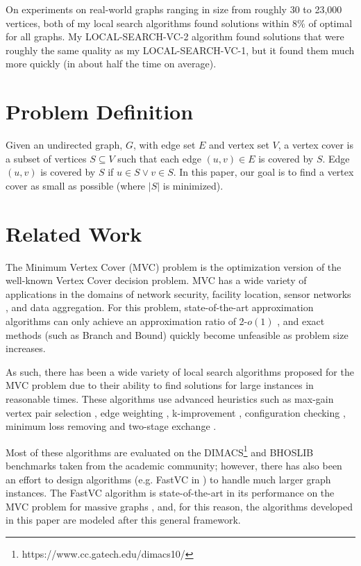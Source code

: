 \documentclass[sigconf]{acmart}
\begin{document}
On experiments on real-world graphs ranging in size from roughly 30 to 23,000 vertices, both of my local search algorithms found solutions within 8\% of optimal for all graphs. My LOCAL-SEARCH-VC-2 algorithm found solutions that were roughly the same quality as my LOCAL-SEARCH-VC-1, but it found them much more quickly (in about half the time on average).


\section{Problem Definition}
Given an undirected graph, $G$, with edge set $E$ and vertex set $V$, a vertex cover is a subset of vertices $S \subseteq V$ such that each edge $(u,v) \in E$ is covered by $S$. Edge $(u,v)$ is covered by $S$ if $u \in S \vee v \in S$. In this paper, our goal is to find a vertex cover as small as possible (where $|S|$ is minimized). 

\section{Related Work}
The Minimum Vertex Cover (MVC) problem is the optimization version of the well-known Vertex Cover decision problem. MVC has a wide variety of applications in the domains of network security, facility location, sensor networks \cite{kavalci2014}, and data aggregation. For this problem, state-of-the-art approximation algorithms can only achieve an approximation ratio of 2-$o(1)$ \cite{halperin_2002}, and exact methods (such as Branch and Bound) quickly become unfeasible as problem size increases.

As such, there has been a wide variety of local search algorithms proposed for the MVC problem due to their ability to find solutions for large instances in reasonable times. These algorithms use advanced heuristics such as max-gain vertex pair selection \cite{richter_helmert_gretton}, edge weighting \cite{richter_helmert_gretton, cai2010}, k-improvement \cite{andrade_resende_werneck}, configuration checking \cite{cai_su_sattar_2011}, minimum loss removing and two-stage exchange \cite{cai2013numvc}. 

Most of these algorithms are evaluated on the DIMACS\footnote{https://www.cc.gatech.edu/dimacs10/} and BHOSLIB benchmarks taken from the academic community; however, there has also been an effort to design algorithms (e.g. FastVC in \cite{cai2015fastvc}) to handle much larger graph instances. The FastVC algorithm is state-of-the-art in its performance on the MVC problem for massive graphs \cite{cai2015fastvc}, and, for this reason, the algorithms developed in this paper are modeled after this general framework.
\end{document}

